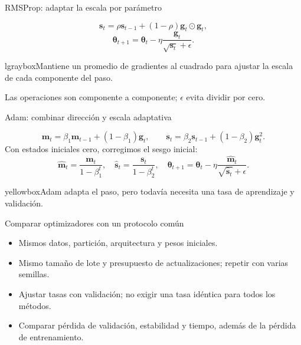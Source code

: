 \documentclass[10pt,aspectratio=169,xcolor={dvipsnames}]{beamer}
\newenvironment{caja}[1][lgraybox]{\begin{beamercolorbox}[sep=0.7em,wd=\linewidth]{#1}}{\end{beamercolorbox}}
\begin{document}
\begin{frame}{RMSProp: adaptar la escala por parámetro}

\[\bm s_t=\rho\bm s_{t-1}+(1-\rho)\bm g_t\odot\bm g_t,\]
\[\bm\theta_{t+1}=\bm\theta_t-
\eta\frac{\bm g_t}{\sqrt{\bm s_t}+\epsilon}.\]
\begin{caja}Mantiene un promedio de gradientes al cuadrado para ajustar la escala de cada componente del paso.\end{caja}
Las operaciones son componente a componente; $\epsilon$ evita dividir por cero.
\end{frame}

\begin{frame}{Adam: combinar dirección y escala adaptativa}

\[\bm m_t=\beta_1\bm m_{t-1}+(1-\beta_1)\bm g_t,\qquad
\bm s_t=\beta_2\bm s_{t-1}+(1-\beta_2)\bm g_t^2.\]
Con estados iniciales cero, corregimos el sesgo inicial:
\[\hat{\bm m}_t=\frac{\bm m_t}{1-\beta_1^t},\quad
\hat{\bm s}_t=\frac{\bm s_t}{1-\beta_2^t},\quad
\bm\theta_{t+1}=\bm\theta_t-\eta\frac{\hat{\bm m}_t}{\sqrt{\hat{\bm s}_t}+\epsilon}.\]
\begin{caja}[yellowbox]Adam adapta el paso, pero todavía necesita una tasa de aprendizaje y validación.\end{caja}
\end{frame}

\begin{frame}{Comparar optimizadores con un protocolo común}
\begin{itemize}
\item Mismos datos, partición, arquitectura y pesos iniciales.
\item Mismo tamaño de lote y presupuesto de actualizaciones; repetir con varias semillas.
\item Ajustar tasas con validación; no exigir una tasa idéntica para todos los métodos.
\item Comparar pérdida de validación, estabilidad y tiempo, además de la pérdida de entrenamiento.
\end{itemize}
\end{frame}
\end{document}
